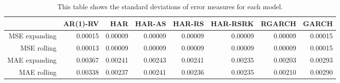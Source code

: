\begin{table}[ht]
\centering
\begin{tabular}{rrrrrrrr}
  \hline
 & AR(1)-RV & HAR & HAR-AS & HAR-RS & HAR-RSRK & RGARCH & GARCH \\ 
  \hline
MSE expanding & 0.00015 & 0.00009 & 0.00009 & 0.00009 & 0.00009 & 0.00009 & 0.00015 \\ 
  MSE rolling & 0.00013 & 0.00009 & 0.00009 & 0.00009 & 0.00009 & 0.00009 & 0.00015 \\ 
  MAE expanding & 0.00367 & 0.00241 & 0.00243 & 0.00241 & 0.00235 & 0.00203 & 0.00293 \\ 
  MAE rolling & 0.00338 & 0.00237 & 0.00241 & 0.00236 & 0.00235 & 0.00210 & 0.00290 \\ 
   \hline
\end{tabular}
\caption[Error measures stddevs]{This table shows the standard deviations of error measures for each model. } 
\label{Table:Error_stddevs}
\end{table}
